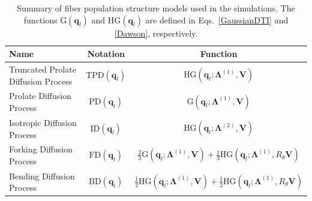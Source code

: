 \documentclass[authoryear,preprint,12pt]{elsarticle}
\newcommand{\q}{\mathbf{q}}
\newcommand{\bsL}{\bs{\Lambda}}
\newcommand{\bld}[1]{\mathbf{#1}}
\newcommand{\bs}[1]{\boldsymbol{#1}}
\begin{document}
\begin{table}[!htbp]
  \caption{Summary of fiber population structure models used in the
    simulations.  The functions $\text{G}(\q_l)$ and $\text{HG}(\q_l)$
    are defined in Eqs.~\eqref{GaussianDTI} and \eqref{Dawson},
    respectively.}
  \label{simulationtable}
  \begin{center}
    \begin{tabular}{lcc}
      \hline
      {\bf Name} & {\bf Notation} & {\bf Function}\\
      \hline
      Truncated Prolate Diffusion Process & $\text{TPD}(\q_l)$ &
      $\text{HG}(\q_l;\bsL^{(1)},\bld{V})$\\
      Prolate Diffusion Process & $\text{PD}(\q_l)$ &
      $\text{G}(\q_l;\bsL^{(1)},\bld{V})$\\
      Isotropic Diffusion Process & $\text{ID}(\q_l)$ &
      $\text{HG}(\q_l;\bsL^{(2)},\bld{V})$\\
      Forking Diffusion Process & $\text{FD}(\q_l)$ &
      $\frac{2}{3}\text{G}(\q_l;\bsL^{(1)},\bld{V}) +
      \frac{1}{3}\text{HG}(\q_l;\bsL^{(1)},R_\theta\bld{V})$\\
      Bending Diffusion Process & $\text{BD}(\q_l)$ &
      $\frac{1}{2}\text{HG}(\q_l;\bsL^{(1)},\bld{V}) +
      \frac{1}{2}\text{HG}(\q_l;\bsL^{(1)},R_\theta\bld{V})$\\
      \hline
    \end{tabular}
  \end{center}
\end{table}
\end{document}
